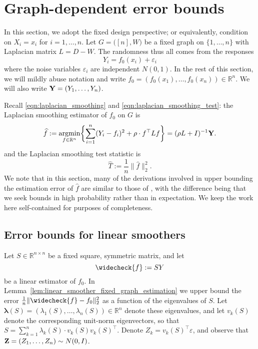 \documentclass[twoside]{article}
\newcommand{\Reals}{\mathbb{R}}
\newcommand{\1}{\mathbf{1}}
\DeclareMathOperator*{\argmin}{argmin}
\newcommand{\lambdavec}{\boldsymbol{\lambda}}
\newcommand{\Lap}{L}
\newcommand{\Id}{I}
\newcommand{\wh}[1]{\widehat{#1}}
\newcommand{\wc}[1]{\widecheck{#1}}
\theoremstyle{definition}
\theoremstyle{remark}
\begin{document}
\section{Graph-dependent error bounds}
\label{sec:fixed_graph_error_bounds}

In this section, we adopt the fixed design perspective; or equivalently, condition on $X_i = x_i$ for $i = 1,\ldots,n$. Let $G = \bigl([n],W\bigr)$ be a fixed graph on $\{1,\ldots,n\}$ with Laplacian matrix $\Lap = D - W$. The randomness thus all comes from the responses 
\begin{equation}
\label{eqn:fixed_graph_regression_model}
Y_i = f_{0}(x_i) + \varepsilon_i
\end{equation}
where the noise variables $\varepsilon_i$ are independent $N(0,1)$. In the rest of this section, we will mildly abuse notation and write $f_0 = (f_0(x_1),\ldots,f_0(x_n)) \in \Reals^n$. We will also write ${\bf Y} = (Y_1,\ldots,Y_n)$.

Recall \eqref{eqn:laplacian_smoothing} and \eqref{eqn:laplacian_smoothing_test}: the Laplacian smoothing estimator of $f_0$ on $G$ is
\begin{equation*}
\label{eqn:ls_G}
\wh{f} := \argmin_{f \in \Reals^n} \biggl\{ \sum_{i = 1}^{n}(Y_i - f_i)^2 + \rho \cdot f^{\top} \Lap f \biggr\} = (\rho \Lap + \Id)^{-1}{\bf Y}.
\end{equation*}
and the Laplacian smoothing test statistic is 
\begin{equation*}
\label{eqn:ls_ts_G}
\wh{T} := \frac{1}{n} \|\wh{f}\|_2^2.
\end{equation*}
We note that in this section, many of the derivations involved in upper bounding the estimation error of $\wh{f}$ are similar to those of \cite{sadhanala16}, with the difference being that we seek bounds in high probability rather than in expectation. We keep the work here self-contained for purposes of completeness.

\subsection{Error bounds for linear smoothers}

Let $S \in \Reals^{n \times n}$ be a fixed square, symmetric matrix, and let 
\begin{equation*}
\wc{f} := SY
\end{equation*}
be a linear estimator of $f_0$. In  Lemma~\ref{lem:linear_smoother_fixed_graph_estimation} we upper bound the error $\frac{1}{n}\|\wc{f} - f_0\|_2^2$ as a function of the eigenvalues of $S$. Let $\lambdavec(S) = (\lambda_1(S),\ldots,\lambda_n(S)) \in \Reals^n$ denote these eigenvalues, and let $v_k(S)$ denote the corresponding unit-norm eigenvectors, so that $S = \sum_{k = 1}^{n} \lambda_k(S) \cdot v_k(S) v_k(S)^{\top}$. Denote $Z_k = v_k(S)^{\top} \varepsilon$, and observe that ${\bf Z} = (Z_1,\ldots,Z_n) \sim N(0,\Id)$. 
\end{document}
